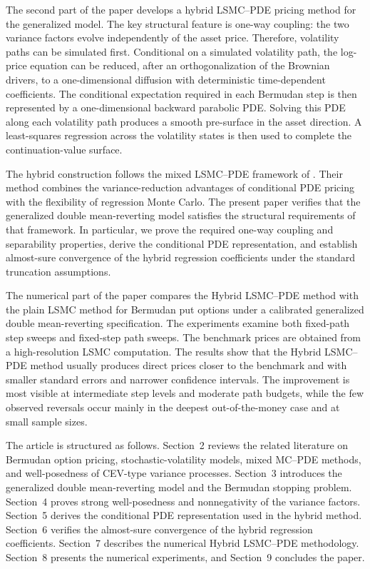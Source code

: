 \documentclass[10pt]{article}
\theoremstyle{plain}
\theoremstyle{definition}
\theoremstyle{remark}
\begin{document}
The second part of the paper develops a hybrid LSMC--PDE pricing method for the generalized model. The key structural feature is one-way coupling: the two variance factors evolve independently of the asset price. Therefore, volatility paths can be simulated first. Conditional on a simulated volatility path, the log-price equation can be reduced, after an orthogonalization of the Brownian drivers, to a one-dimensional diffusion with deterministic time-dependent coefficients. The conditional expectation required in each Bermudan step is then represented by a one-dimensional backward parabolic PDE. Solving this PDE along each volatility path produces a smooth pre-surface in the asset direction. A least-squares regression across the volatility states is then used to complete the continuation-value surface.

The hybrid construction follows the mixed LSMC--PDE framework of \citet{farahany2020mixing}. Their method combines the variance-reduction advantages of conditional PDE pricing with the flexibility of regression Monte Carlo. The present paper verifies that the generalized double mean-reverting model satisfies the structural requirements of that framework. In particular, we prove the required one-way coupling and separability properties, derive the conditional PDE representation, and establish almost-sure convergence of the hybrid regression coefficients under the standard truncation assumptions.

The numerical part of the paper compares the Hybrid LSMC--PDE method with the plain LSMC method for Bermudan put options under a calibrated generalized double mean-reverting specification. The experiments examine both fixed-path step sweeps and fixed-step path sweeps. The benchmark prices are obtained from a high-resolution LSMC computation. The results show that the Hybrid LSMC--PDE method usually produces direct prices closer to the benchmark and with smaller standard errors and narrower confidence intervals. The improvement is most visible at intermediate step levels and moderate path budgets, while the few observed reversals occur mainly in the deepest out-of-the-money case and at small sample sizes.

The article is structured as follows. Section~2 reviews the related literature on Bermudan option pricing, stochastic-volatility models, mixed MC--PDE methods, and well-posedness of CEV-type variance processes. Section~3 introduces the generalized double mean-reverting model and the Bermudan stopping problem. Section~4 proves strong well-posedness and nonnegativity of the variance factors. Section~5 derives the conditional PDE representation used in the hybrid method. Section~6 verifies the almost-sure convergence of the hybrid regression coefficients. Section~7 describes the numerical Hybrid LSMC--PDE methodology. Section~8 presents the numerical experiments, and Section~9 concludes the paper.
\end{document}
